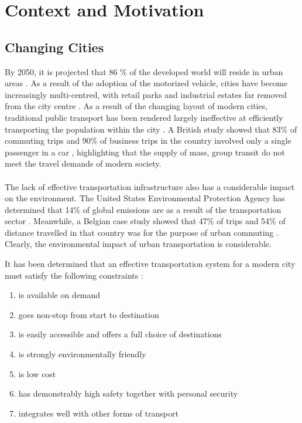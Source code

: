 \documentclass[12pt,letterpaper]{article}
\begin{document}
	
\section{Context and Motivation}

\subsection{Changing Cities}

By 2050, it is projected that 86 \% of the developed world will reside in urban areas \cite{Economist}. 
As a result of the adoption of the motorized vehicle, cities have become increasingly multi-centred, with retail parks and industrial estates far removed from the city centre \cite{SustainableTransport}. 
As a result of the changing layout of modern cities, traditional public transport has been rendered largely ineffective at efficiently transporting the population within the city \cite{SustainableTransport}. 
A British study showed that 83\% of commuting trips and 90\% of business trips in the country involved only a single passenger in a car \cite{NTS}, highlighting that the supply of mass, group transit do not meet the travel demands of modern society.
\\
\\
The lack of effective transportation infrastructure also has a considerable impact on the environment. 
The United States Environmental Protection Agency has determined that 14\% of global emissions are as a result of the transportation sector \cite{EPA}. 
Meanwhile, a Belgian case study showed that 47\% of trips and 54\% of distance travelled in that country was for the purpose of urban commuting \cite{Belgium}. 
Clearly, the environmental impact of urban transportation is considerable.

It has been determined that an effective transportation system for a modern city must satisfy the following constraints \cite{SustainableTransport}:

\begin{enumerate}
	\item is available on demand
	\item goes non-stop from start to destination
	\item is easily accessible and offers a full choice of destinations
	\item is strongly environmentally friendly
	\item is low cost
	\item has demonstrably high safety together with personal security
	\item integrates well with other forms of transport
\end{enumerate}
\end{document}
